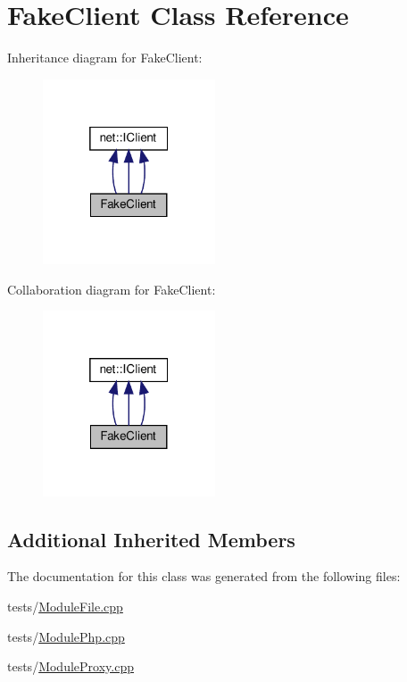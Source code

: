 \hypertarget{classFakeClient}{}\section{Fake\+Client Class Reference}
\label{classFakeClient}


Inheritance diagram for Fake\+Client\+:
\nopagebreak
\begin{figure}[H]
\begin{center}
\leavevmode
\includegraphics[width=145pt]{classFakeClient__inherit__graph}
\end{center}
\end{figure}


Collaboration diagram for Fake\+Client\+:
\nopagebreak
\begin{figure}[H]
\begin{center}
\leavevmode
\includegraphics[width=145pt]{classFakeClient__coll__graph}
\end{center}
\end{figure}
\subsection*{Additional Inherited Members}


The documentation for this class was generated from the following files\+:\begin{DoxyCompactItemize}
\item 
tests/\hyperlink{ModuleFile_8cpp}{Module\+File.\+cpp}\item 
tests/\hyperlink{ModulePhp_8cpp}{Module\+Php.\+cpp}\item 
tests/\hyperlink{ModuleProxy_8cpp}{Module\+Proxy.\+cpp}\end{DoxyCompactItemize}
